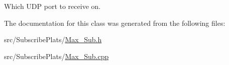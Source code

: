 Which U\+DP port to receive on. 



The documentation for this class was generated from the following files\+:\begin{DoxyCompactItemize}
\item 
src/\+Subscribe\+Plats/\hyperlink{_max___sub_8h}{Max\+\_\+\+Sub.\+h}\item 
src/\+Subscribe\+Plats/\hyperlink{_max___sub_8cpp}{Max\+\_\+\+Sub.\+cpp}\end{DoxyCompactItemize}

